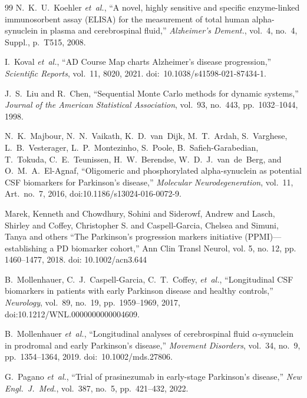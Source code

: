 \begin{thebibliography}{99}
N.~K.~U.~Koehler \textit{et~al.}, ``A novel, highly sensitive and specific enzyme-linked immunosorbent assay (ELISA) for the measurement of total human alpha-synuclein in plasma and cerebrospinal fluid,'' \textit{Alzheimer's Dement.}, vol.~4, no.~4, Suppl., p.~T515, 2008.


I.~Koval \textit{et~al.}, ``AD Course Map charts Alzheimer's disease progression,'' \textit{Scientific Reports}, vol.~11, 8020, 2021. doi:~10.1038/s41598-021-87434-1.

J.~S.~Liu and R.~Chen, ``Sequential Monte Carlo methods for dynamic systems,'' \textit{Journal of the American Statistical Association}, vol.~93, no.~443, pp.~1032--1044, 1998.


N.~K.~Majbour, N.~N.~Vaikath, K.~D.~van~Dijk, M.~T.~Ardah, S.~Varghese, L.~B.~Vesterager, L.~P.~Montezinho, S.~Poole, B.~Safieh-Garabedian, T.~Tokuda, C.~E.~Teunissen, H.~W.~Berendse, W.~D.~J.~van~de~Berg, and O.~M.~A.~El-Agnaf, ``Oligomeric and phosphorylated alpha-synuclein as potential CSF biomarkers for Parkinson's disease,'' \textit{Molecular Neurodegeneration}, vol.~11, Art.\ no.~7, 2016, doi:10.1186/s13024-016-0072-9.

 Marek, Kenneth and Chowdhury, Sohini and Siderowf, Andrew and Lasch, Shirley and Coffey, Christopher S. and Caspell-Garcia, Chelsea and Simuni, Tanya and others ``The Parkinson's progression markers initiative (PPMI)---establishing a PD biomarker cohort,'' Ann Clin Transl Neurol, vol. 5, no. 12, pp. 1460--1477, 2018. doi: 10.1002/acn3.644

B.~Mollenhauer, C.~J.~Caspell-Garcia, C.~T.~Coffey, \textit{et~al.}, ``Longitudinal CSF biomarkers in patients with early Parkinson disease and healthy controls,'' \textit{Neurology}, vol.~89, no.~19, pp.~1959--1969, 2017, doi:10.1212/WNL.0000000000004609.

B.~Mollenhauer \textit{et~al.}, ``Longitudinal analyses of cerebrospinal fluid $\alpha$-synuclein in prodromal and early Parkinson's disease,'' \textit{Movement Disorders}, vol.~34, no.~9, pp.~1354--1364, 2019. doi:~10.1002/mds.27806.

G.~Pagano \textit{et~al.}, ``Trial of prasinezumab in early-stage Parkinson's disease,'' \textit{New Engl.~J.~Med.}, vol.~387, no.~5, pp.~421--432, 2022.


\end{thebibliography}

